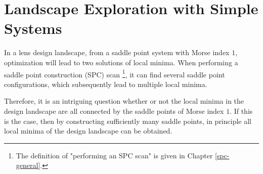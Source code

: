 \setlength{\parskip}{.2em}
\graphicspath{ {./chapter-3/figures/} }
\captionsetup[figure]{labelfont=bf}
\captionsetup{margin=1.5em}
\captionsetup[table]{labelfont=bf}


\chapter{Landscape Exploration with Simple Systems}
\label{chapter_SPC_simple_system_landscape}







\noindent 
In a lens design landscape, from a saddle point system with Morse index $1$, optimization will lead to two solutions of local minima.  When performing a saddle point construction (SPC) scan \footnote{The definition of "performing an SPC scan" is given in Chapter \ref{spc-general}.}, it can find several saddle point configurations, which subsequently lead to multiple local minima. 

Therefore, it is an intriguing question whether or not the local minima in the design landscape are all connected by the saddle points of Morse index $1$. If this is the case, then by constructing sufficiently many saddle points, in principle all local minima of the design landscape can be obtained. 

